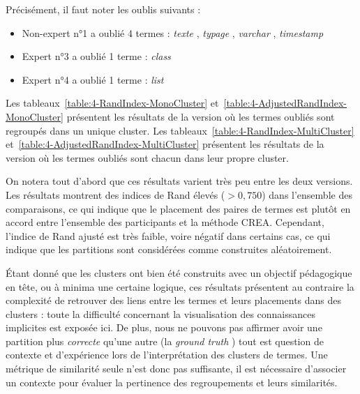 Précisément, il faut noter les oublis suivants :
\begin{itemize}
\item Non-expert n°1 a oublié 4 termes : \og \textit{texte} \fg, \og \textit{typage} \fg, \og \textit{varchar} \fg, \og \textit{timestamp} \fg
\item Expert n°3 a oublié 1 terme : \og \textit{class} \fg
\item Expert n°4 a oublié 1 terme : \og \textit{list} \fg
\end{itemize}

\bigskip

Les tableaux~\ref{table:4-RandIndex-MonoCluster} et~\ref{table:4-AdjustedRandIndex-MonoCluster} présentent les résultats de la version où les termes oubliés sont regroupés dans un unique cluster.
Les tableaux~\ref{table:4-RandIndex-MultiCluster} et~\ref{table:4-AdjustedRandIndex-MultiCluster} présentent les résultats de la version où les termes oubliés sont chacun dans leur propre cluster.

\bigskip

On notera tout d'abord que ces résultats varient très peu entre les deux versions.
Les résultats montrent des indices de Rand élevés ($ > 0,750 $) dans l'ensemble des comparaisons, ce qui indique que le placement des paires de termes est plutôt en accord entre l'ensemble des participants et la méthode CREA.
Cependant, l'indice de Rand ajusté est très faible, voire négatif dans certains cas, ce qui indique que les partitions sont considérées comme construites aléatoirement.

\bigskip

\'Etant donné que les clusters ont bien été construits avec un objectif pédagogique en tête, ou à minima une certaine logique, ces résultats présentent au contraire la complexité de retrouver des liens entre les termes et leurs placements dans des clusters : toute la difficulté concernant la visualisation des connaissances implicites est exposée ici.
De plus, nous ne pouvons pas affirmer avoir une partition plus \textit{correcte} qu'une autre (la \og \textit{ground truth} \fg) tout est question de contexte et d'expérience lors de l'interprétation des clusters de termes.
Une métrique de similarité seule n'est donc pas suffisante, il est nécessaire d'associer un contexte pour évaluer la pertinence des regroupements et leurs similarités.



\newpage

\hspace{0pt}
\vfill


